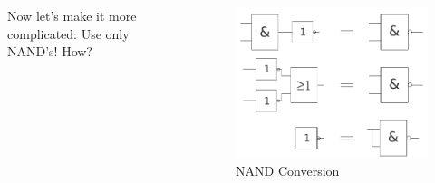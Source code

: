\documentclass{beamer}
\begin{document}
\begin{frame}
  \begin{columns}
  \begin{column}{5cm}
  Now let's make it more complicated: 
  \newline Use only NAND's! How?
  \newline\newline
  \end{column}
  
  \begin{column}{6cm}
    \begin{figure}[H]
      \centering
      \includegraphics[width=1\textwidth]{nand_conversion}%
      \caption{NAND Conversion}%
      \label{fig:equivalence_optimized}
    \end{figure}
  \end{column}
  \end{columns}  
\end{frame}
\end{document}
